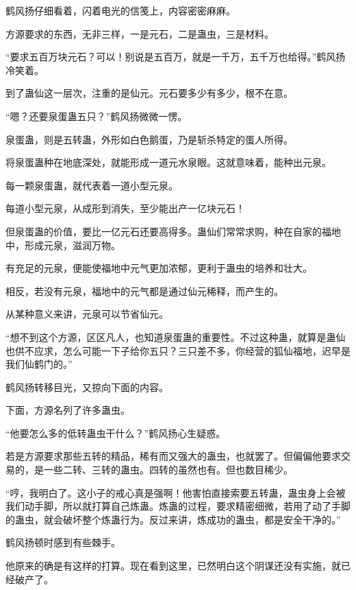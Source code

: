 
\begin{this_body}



鹤风扬仔细看着，闪着电光的信笺上，内容密密麻麻。

方源要求的东西，无非三样，一是元石，二是蛊虫，三是材料。

“要求五百万块元石？可以！别说是五百万，就是一千万，五千万也给得。”鹤风扬冷笑着。

到了蛊仙这一层次，注重的是仙元。元石要多少有多少，根不在意。

“嗯？还要泉蛋蛊五只？”鹤风扬微微一愣。

泉蛋蛊，则是五转蛊，外形如白色鹅蛋，乃是斩杀特定的蛋人所得。

将泉蛋蛊种在地底深处，就能形成一道元水泉眼。这就意味着，能种出元泉。

每一颗泉蛋蛊，就代表着一道小型元泉。

每道小型元泉，从成形到消失，至少能出产一亿块元石！

但泉蛋蛊的价值，要比一亿元石还要高得多。蛊仙们常常求购，种在自家的福地中，形成元泉，滋润万物。

有充足的元泉，便能使福地中元气更加浓郁，更利于蛊虫的培养和壮大。

相反，若没有元泉，福地中的元气都是通过仙元稀释，而产生的。

从某种意义来讲，元泉可以节省仙元。

“想不到这个方源，区区凡人，也知道泉蛋蛊的重要性。不过这种蛊，就算是蛊仙也供不应求，怎么可能一下子给你五只？三只差不多，你经营的狐仙福地，迟早是我们仙鹤门的。”

鹤风扬转移目光，又掠向下面的内容。

下面，方源名列了许多蛊虫。

“他要怎么多的低转蛊虫干什么？”鹤风扬心生疑惑。

若是方源要求那些五转的精品，稀有而又强大的蛊虫，也就罢了。但偏偏他要求交易的，是一些二转、三转的蛊虫。四转的虽然也有。但也数目稀少。

“哼，我明白了。这小子的戒心真是强啊！他害怕直接索要五转蛊，蛊虫身上会被我们动手脚，所以就打算自己炼蛊。炼蛊的过程，要求精密细微，若用了动了手脚的蛊虫，就会破坏整个炼蛊行为。反过来讲，炼成功的蛊虫，都是安全干净的。”

鹤风扬顿时感到有些棘手。

他原来的确是有这样的打算。现在看到这里，已然明白这个阴谋还没有实施，就已经破产了。


\end{this_body}
